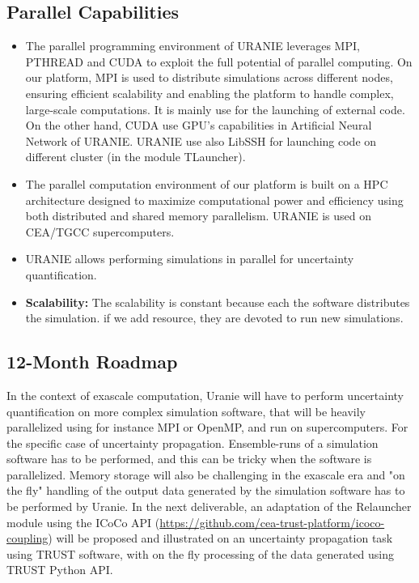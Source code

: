 \subsection{Parallel Capabilities}
\label{sec:WP6:Uranie:performances}


\begin{itemize}
    \item The parallel programming environment of URANIE leverages MPI, PTHREAD
    and CUDA to exploit the full potential of parallel computing. 
    On our platform, MPI is used to distribute simulations across different nodes,
    ensuring efficient scalability and enabling the platform to handle complex, large-scale computations. It is mainly use for the launching of external code.
    On the other hand, CUDA use GPU's capabilities in Artificial Neural Network of URANIE.
    URANIE use also LibSSH for launching code on different cluster (in the module TLauncher).

    \item The parallel computation environment of our platform is built on a HPC architecture designed to maximize computational power and efficiency
    using both distributed and shared memory parallelism. URANIE is used on CEA/TGCC supercomputers.

    \item URANIE allows performing simulations in parallel for uncertainty quantification.
    \item \textbf{Scalability:} The scalability is constant because each the software distributes the simulation. if we add resource, they are devoted to run new simulations.
\end{itemize}

\subsection{12-Month Roadmap}
\label{sec:WP6:Uranie:roadmap}

In the context of exascale computation, Uranie will have to perform uncertainty quantification on more complex simulation software, that will be heavily parallelized using for instance MPI or OpenMP, and run on supercomputers. For the specific case of uncertainty propagation. Ensemble-runs of a simulation software has to be performed, and this can be tricky when the software is parallelized. Memory storage will also be challenging in the exascale era and "on the fly" handling of the output data generated by the simulation software has to be performed by Uranie. In the next deliverable, an adaptation of the Relauncher module using the ICoCo API (\url{https://github.com/cea-trust-platform/icoco-coupling}) will be proposed and illustrated on an uncertainty propagation task using TRUST software, with on the fly processing of the data generated using TRUST Python API.  

